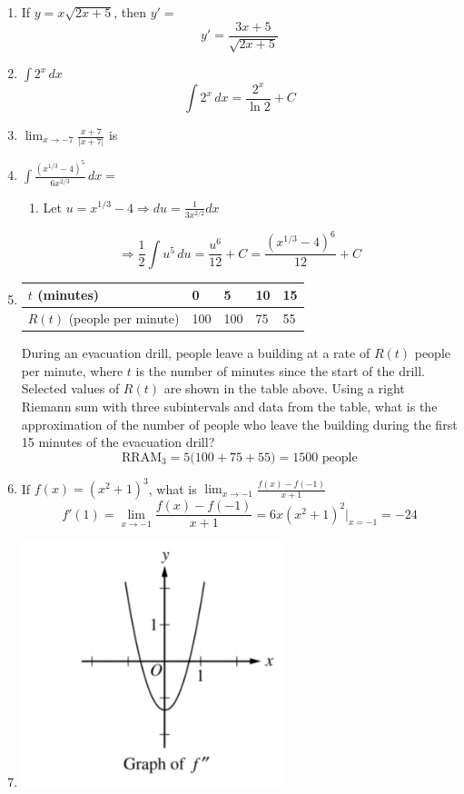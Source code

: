 \documentclass[12pt]{article}
\begin{document}
\begin{enumerate}
\begin{center}
    \end{center}
    \item If $y=x\sqrt{2x+5}$, then $y'=$
    $$\boxed{y'=\frac{3x+5}{\sqrt{2x+5}}}$$
    \item $\int 2^x \, dx$
    $$\int 2^x \, dx = \frac{2^x}{\ln 2} + C$$
    \item $\lim_{x\to -7} \frac{x+7}{|x+7|}$ is 
    \item $\int \frac{(x^{1/3}-4)^5}{6x^{2/3}} \, dx =$
    \begin{enumerate}
        \item Let $u=x^{1/3}-4 \Longrightarrow du = \frac{1}{3x^{2/2}} dx$
    \end{enumerate}
    $$\Longrightarrow \frac{1}{2}\int u^5 \, du = \frac{u^6}{12} +C = \boxed{\frac{(x^{1/3}-4)^6}{12}+C}$$
    \item  
        \begin{table}[h!]
            \centering
            \begin{tabular}{|l||l|l|l|l|}
            \hline
            $t$ (minutes)              & 0   & 5   & 10 & 15 \\ \hline
            $R(t)$ (people per minute) & 100 & 100 & 75 & 55 \\ \hline
            \end{tabular}
        \end{table}
     During an evacuation drill, people leave a building at a rate of $R(t)$ people per minute, where $t$ is the number of minutes since the start of the drill. Selected values of $R(t)$ are shown in the table above. Using a right Riemann sum with three subintervals and data from the table, what is the approximation of the number of people who leave the building during the first 15 minutes of the evacuation drill?
     $$\text{RRAM}_3 = 5\big(100+75+55\big)=\boxed{1500 \text{ people}}$$
     \item If $f(x)=(x^2+1)^3$, what is $\lim_{x\to -1} \frac{f(x)-f(-1)}{x+1}$
     $$f'(1)= \lim_{x\to -1} \frac{f(x)-f(-1)}{x+1} = 6x(x^2+1)^2\bigg\rvert_{x=-1}=\boxed{-24}$$
     \item 
        \begin{center}
            \includegraphics[width=3in]{FEM7.png}

\end{center}
\end{enumerate}
\end{document}
